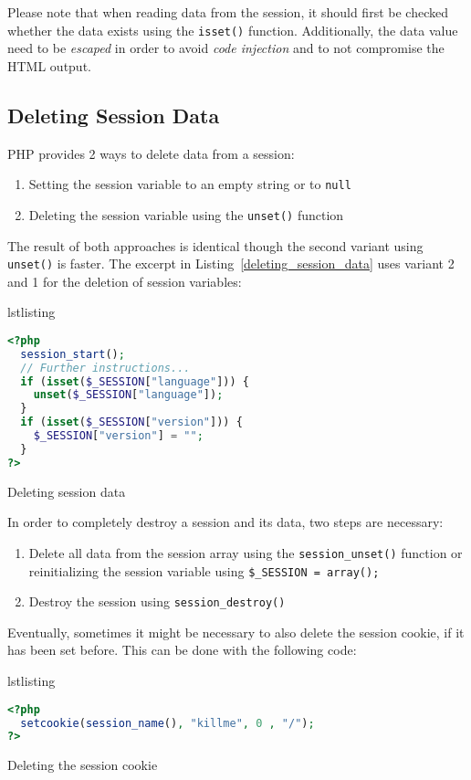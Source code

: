 \documentclass[a4paper, justified, notoc]{tufte-handout} %
\makeatletter
\newenvironment{listing}[1][htbp]
  {\ifvmode\else\unskip\fi\begin{@tufte@float}[#1]{lstlisting}{}}
  {\end{@tufte@float} } %
\makeatother
\begin{document}
Please note that when reading data from the session, it should first be checked whether the data exists using the \texttt{isset()} function. Additionally, the data value need to be \emph{escaped} in order to avoid \emph{code injection} and to not compromise the HTML output. 

\subsection{Deleting Session Data} %
\label{sub:deleting_session_data}
PHP provides 2 ways to delete data from a session:
\begin{enumerate}
	\item Setting the session variable to an empty string or to \texttt{null}
	\item Deleting the session variable using the \texttt{unset()} function
\end{enumerate}
The result of both approaches is identical though the second variant using \texttt{unset()} is faster. 
The excerpt in Listing~\ref{deleting_session_data} uses variant 2 and 1 for the deletion of session variables:
\begin{listing}
\begin{lstlisting}[language=PHP]
<?php
  session_start();
  // Further instructions...
  if (isset($_SESSION["language"])) {
    unset($_SESSION["language"]);
  }
  if (isset($_SESSION["version"])) {
    $_SESSION["version"] = "";
  }
?>
\end{lstlisting}
	\caption{Deleting session data}
	\label{deleting_session_data}
\end{listing}

In order to completely destroy a session and its data, two steps are necessary:
\begin{enumerate}
	\item Delete all data from the session array using the \texttt{session\_unset()} function or reinitializing the session variable using \texttt{\$\_SESSION = array();}
	\item Destroy the session using \texttt{session\_destroy()}
\end{enumerate}

Eventually, sometimes it might be necessary to also delete the session cookie, if it has been set before. 
This can be done with the following code:
\begin{listing}
\begin{lstlisting}[language=PHP]
<?php
  setcookie(session_name(), "killme", 0 , "/");
?>
\end{lstlisting}
	\caption{Deleting the session cookie}
	\label{deleting_session_cookie}
\end{listing}
\end{document}
